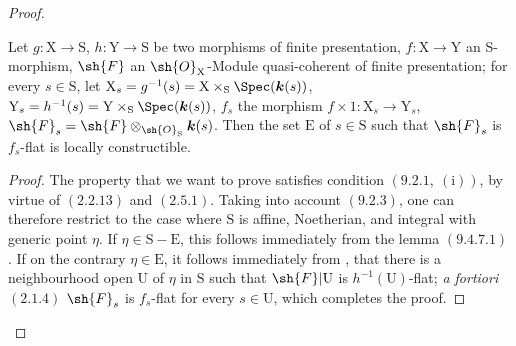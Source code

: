 \begin{proof}
\begin{proposition}[11.2.8]
\label{IV.11.2.8}
Let $g:\mathrm{X}\to\mathrm{S}$, $h:\mathrm{Y}\to\mathrm{S}$ be two morphisms of finite presentation, $f:\mathrm{X}\to\mathrm{Y}$ an S-morphism, $\sh{F}$ an $\sh{O}_\mathrm{X}$-Module quasi-coherent of finite presentation; for every $s\in\mathrm{S}$, let $\mathrm{X}_s=g^{-1}(s)=\mathrm{X}\times_\mathrm{S}\Spec(\boldsymbol{k}(s))$, $\mathrm{Y}_s=h^{-1}(s)=\mathrm{Y}\times_\mathrm{S}\Spec(\boldsymbol{k}(s))$, $f_s$ the morphism $f\times 1:\mathrm{X}_s\to\mathrm{Y}_s$, $\sh{F}_s=\sh{F}\otimes_{\sh{O}_\mathrm{S}}\boldsymbol{k}(s)$. Then the set $\mathrm{E}$ of $s\in\mathrm{S}$ such that $\sh{F}_s$ is $f_s$-flat is locally constructible.
\end{proposition}

\begin{proof}
The property that we want to prove satisfies condition $(9.2.1,~(\mathrm{i}))$, by virtue of $(2.2.13)$ and $(2.5.1)$. Taking into account $(9.2.3)$, one can therefore restrict to the case where $\mathrm{S}$ is affine, Noetherian, and integral with generic point $\eta$. If $\eta\in\mathrm{S}-\mathrm{E}$, this follows immediately from the lemma $(9.4.7.1)$. If on the contrary $\eta\in\mathrm{E}$, it follows immediately from , that there is a neighbourhood open $\mathrm{U}$ of $\eta$ in $\mathrm{S}$ such that $\sh{F}|\mathrm{U}$ is $h^{-1}(\mathrm{U})$-flat; \emph{a fortiori} $(2.1.4)$ $\sh{F}_s$ is $f_s$-flat for every $s\in\mathrm{U}$, which completes the proof.
\end{proof}


\end{proof}
